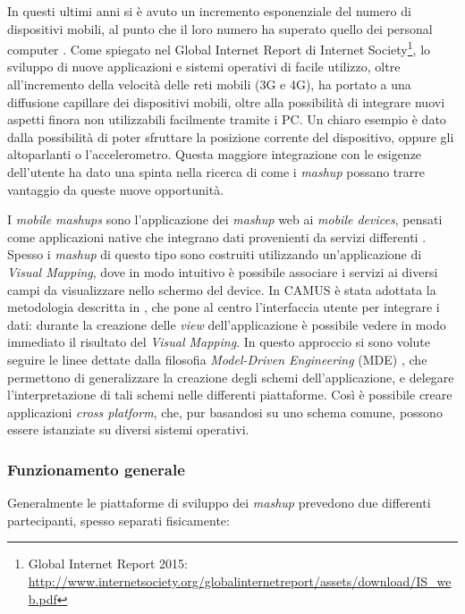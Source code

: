 In questi ultimi anni si è avuto un incremento esponenziale del numero di dispositivi mobili, al punto che il loro numero ha superato quello dei personal computer \cite{10.1109/ICSC.2008.100}. Come spiegato nel Global Internet Report di Internet Society\footnote{Global Internet Report 2015: \url{http://www.internetsociety.org/globalinternetreport/assets/download/IS_web.pdf}}, lo sviluppo di nuove applicazioni e sistemi operativi di facile utilizzo, oltre all'incremento della velocità delle reti mobili (3G e 4G), ha portato a una diffusione capillare dei dispositivi mobili, oltre alla possibilità di integrare nuovi aspetti finora non utilizzabili facilmente tramite i PC. Un chiaro esempio è dato dalla possibilità di poter sfruttare la posizione corrente del dispositivo, oppure gli altoparlanti o l'accelerometro.
Questa maggiore integrazione con le esigenze dell'utente ha dato una spinta nella ricerca di come i \emph{mashup} possano trarre vantaggio da queste nuove opportunità.

I \emph{mobile mashups} sono l'applicazione dei \emph{mashup} web ai \emph{mobile devices}, pensati come applicazioni native che integrano dati provenienti da servizi differenti \cite{Cappiello2013}. 
Spesso i \emph{mashup} di questo tipo sono costruiti utilizzando un'applicazione di \emph{Visual Mapping}, dove in modo intuitivo è possibile associare i servizi ai diversi campi da visualizzare nello schermo del device.
In CAMUS è stata adottata la metodologia descritta in \cite{Cappiello:2015:UAE:2788341.2735632}, che pone al centro l'interfaccia utente per integrare i dati: durante la creazione delle \emph{view} dell'applicazione è possibile vedere in modo immediato il risultato del \emph{Visual Mapping}. In questo approccio si sono volute seguire le linee dettate dalla filosofia \emph{Model-Driven Engineering} (MDE) \cite{schmidt2006model}, che permettono di generalizzare la creazione degli schemi dell'applicazione, e delegare l'interpretazione di tali schemi nelle differenti piattaforme. Così è possibile creare applicazioni \emph{cross platform}, che, pur basandosi su uno schema comune, possono essere istanziate su diversi sistemi operativi. 

\subsubsection{Funzionamento generale\label{sec:mashup-operations}}

Generalmente le piattaforme di sviluppo dei \emph{mashup} prevedono due differenti partecipanti, spesso separati fisicamente:

